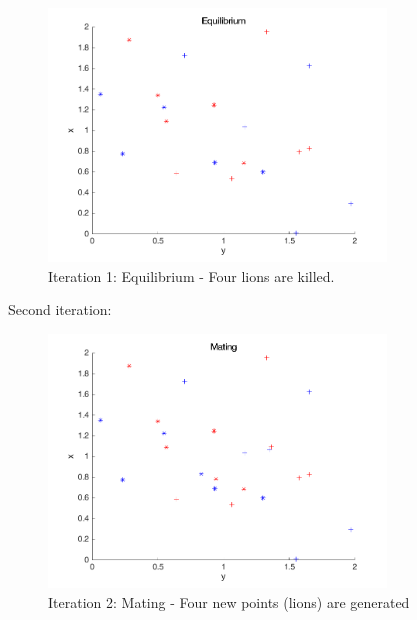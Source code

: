 \begin{figure}[H]
\begin{center}
\includegraphics[width=0.8\textwidth]{img/mdme/equilibrium1}
\caption{Iteration 1: Equilibrium - Four lions are killed.}
\end{center}
\end{figure}

Second iteration:
\begin{figure}[H]
\begin{center}
\includegraphics[width=0.8\textwidth]{img/mdme/mating2}
\caption{Iteration 2: Mating - Four new points (lions) are generated}
\end{center}
\end{figure}

